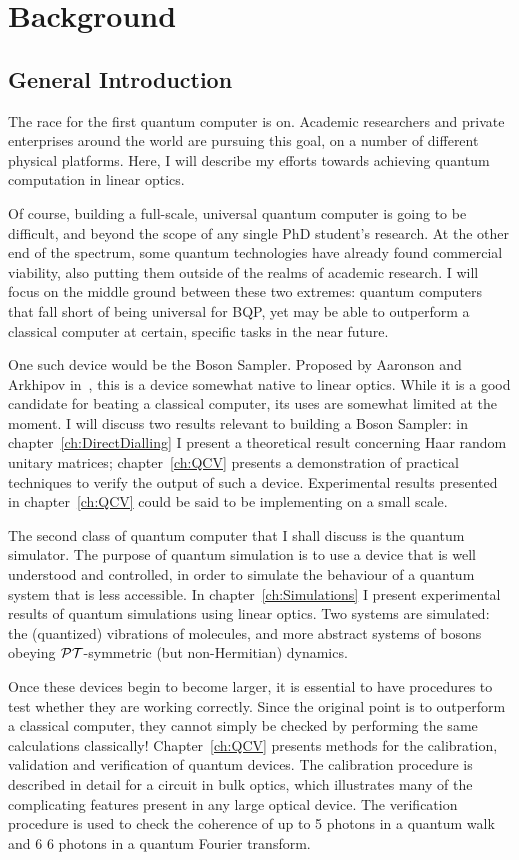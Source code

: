 \chapter{Background}
\label{ch:Introduction}
\section{General Introduction}
\label{sec:Science}
The race for the first quantum computer is on. Academic researchers and private
enterprises around the world are pursuing this goal, on a number of different
physical platforms. Here, I will describe my efforts towards achieving quantum
computation in linear optics.

Of course, building a full-scale, universal quantum computer is going to be
difficult, and beyond the scope of any single PhD student's research. At the
other end of the spectrum, some quantum technologies have already found
commercial viability, also putting them outside of the realms of academic
research. I will focus on the middle ground between these two extremes: quantum
computers that fall short of being universal for BQP, yet may be able to
outperform a classical computer at certain, specific tasks in the near future.

One such device would be the Boson Sampler. Proposed by Aaronson and Arkhipov
in~\cite{bosonsampling}, this is a device somewhat native to linear optics.
While it is
a good candidate for beating a classical computer, its uses are somewhat limited
at the moment. I will discuss two results relevant to building a Boson Sampler:
in chapter~\ref{ch:DirectDialling} I present a theoretical result concerning
Haar random unitary matrices; chapter~\ref{ch:QCV} presents a demonstration of
practical techniques to verify the output of such a device. Experimental results
presented in chapter~\ref{ch:QCV} could be said to be implementing
\bosonsampling{ }on a small scale.

The second class of quantum computer that I shall discuss is the quantum
simulator. The purpose of quantum simulation is to use a device that is well
understood and controlled, in order to simulate the behaviour of a quantum
system that is less accessible. In chapter~\ref{ch:Simulations} I present
experimental results of quantum simulations using linear optics. Two systems are
simulated: the (quantized) vibrations of molecules, and more abstract systems of
bosons obeying \(\mathcal{PT}\)-symmetric (but non-Hermitian) dynamics.

Once these devices begin to become larger, it is essential to have procedures to
test whether they are working correctly. Since the original point is to
outperform a classical computer, they cannot simply be checked by performing the
same calculations classically! Chapter~\ref{ch:QCV} presents methods for the
calibration, validation and verification of quantum devices. The calibration
procedure is described in detail for a circuit in bulk optics, which illustrates
many of the complicating features present in any large optical device. The
verification procedure is used to check the coherence  of up to 5 photons in a quantum walk and 6
6 photons in a quantum Fourier transform.

